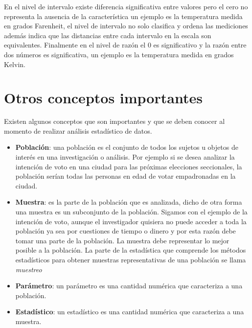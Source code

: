 \documentclass[letterpaper,]{book}
\providecommand{\tightlist}{%
  \setlength{\itemsep}{0pt}\setlength{\parskip}{0pt}}
\begin{document}
En el nivel de intervalo existe diferencia significativa entre valores pero el cero no representa la ausencia de la característica un ejemplo es la temperatura medida en grados Farenheit, el nivel de intervalo no solo clasifica y ordena las mediciones además indica que las distancias entre cada intervalo en la escala son equivalentes. Finalmente en el nivel de razón el 0 es significativo y la razón entre dos números es significativa, un ejemplo es la temperatura medida en grados Kelvin.

\hypertarget{otros-conceptos-importantes}{%
\section{Otros conceptos importantes}\label{otros-conceptos-importantes}}

Existen algunos conceptos que son importantes y que se deben conocer al momento de realizar análisis estadístico de datos.

\begin{itemize}
\tightlist
\item
  \textbf{Población}: una población es el conjunto de todos los sujetos u objetos de interés en una investigación o análisis. Por ejemplo si se desea analizar la intención de voto en una ciudad para las próximas elecciones seccionales, la población serían todas las personas en edad de votar empadronadas en la ciudad.
\item
  \textbf{Muestra}: es la parte de la población que es analizada, dicho de otra forma una muestra es un subconjunto de la población. Sigamos con el ejemplo de la intención de voto, aunque el investigador quisiera no puede acceder a toda la población ya sea por cuestiones de tiempo o dinero y por esta razón debe tomar una parte de la población. La muestra debe representar lo mejor posible a la población. La parte de la estadística que comprende los métodos estadísticos para obtener muestras representativas de una población se llama \emph{muestreo}
\item
  \textbf{Parámetro}: un parámetro es una cantidad numérica que caracteriza a una población.
\item
  \textbf{Estadístico}: un estadístico es una cantidad numérica que caracteriza a una muestra.
\end{itemize}
\end{document}
